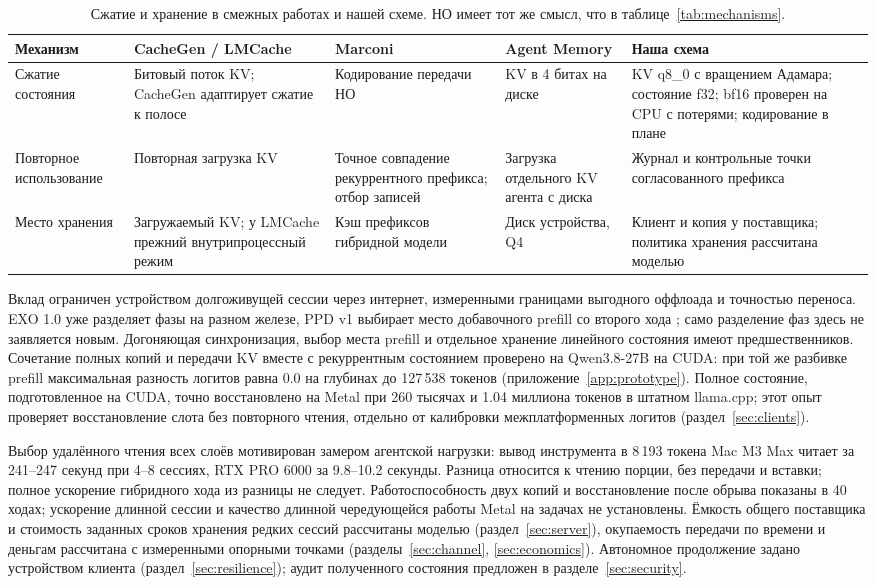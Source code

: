 \begin{table}[t]
\centering
\caption{Сжатие и хранение в смежных работах и нашей схеме. НО имеет тот же смысл, что в таблице~\ref{tab:mechanisms}.}
\label{tab:cache-mechanisms}
\scriptsize
\setlength{\tabcolsep}{1mm}
\begin{tabular}{L{26mm}L{34mm}L{31mm}L{31mm}L{34mm}}
\toprule
Механизм & CacheGen / LMCache \cite{liu2024cachegen,lmcacheCachegen} & Marconi \cite{pan2025marconi} & Agent Memory \cite{shkolnikov2026agentmemory} & Наша схема \\
\midrule
Сжатие состояния & Битовый поток KV; CacheGen адаптирует сжатие к полосе & Кодирование передачи НО & KV в 4 битах на диске & KV q8\_0 с вращением Адамара; состояние f32; bf16 проверен на CPU с потерями; кодирование в плане \\
Повторное использование & Повторная загрузка KV & Точное совпадение рекуррентного префикса; отбор записей & Загрузка отдельного KV агента с диска & Журнал и контрольные точки согласованного префикса \\
Место хранения & Загружаемый KV; у LMCache прежний внутрипроцессный режим & Кэш префиксов гибридной модели & Диск устройства, Q4 & Клиент и копия у поставщика; политика хранения рассчитана моделью \\
\bottomrule
\end{tabular}
\end{table}

Вклад ограничен устройством долгоживущей сессии через интернет, измеренными границами выгодного оффлоада
и точностью переноса. EXO 1.0 уже разделяет фазы на разном железе, PPD v1 выбирает место добавочного prefill
со второго хода \cite{exolabsSpark,li2026ppd}; само разделение фаз здесь не заявляется новым.
Догоняющая синхронизация, выбор места prefill и отдельное хранение линейного состояния имеют предшественников.
Сочетание полных копий и передачи KV вместе с рекуррентным состоянием проверено на Qwen3.8-27B на CUDA:
при той же разбивке prefill максимальная разность логитов равна 0.0 на глубинах до 127\,538 токенов
(приложение~\ref{app:prototype}). Полное состояние, подготовленное на CUDA, точно восстановлено на Metal
при 260 тысячах и 1.04 миллиона токенов в штатном llama.cpp; этот опыт проверяет восстановление слота без
повторного чтения, отдельно от калибровки межплатформенных логитов (раздел~\ref{sec:clients}).

Выбор удалённого чтения всех слоёв мотивирован замером агентской нагрузки: вывод инструмента в 8\,193 токена
Mac M3 Max читает за 241--247 секунд при 4--8 сессиях, RTX PRO 6000 за 9.8--10.2 секунды.
Разница относится к чтению порции, без передачи и вставки; полное ускорение гибридного хода из разницы не следует.
Работоспособность двух копий и восстановление после обрыва показаны в 40 ходах;
ускорение длинной сессии и качество длинной чередующейся работы Metal на задачах не установлены.
Ёмкость общего поставщика и стоимость заданных сроков хранения редких сессий рассчитаны моделью
(раздел~\ref{sec:server}), окупаемость передачи по времени и деньгам рассчитана с измеренными опорными точками
(разделы~\ref{sec:channel}, \ref{sec:economics}). Автономное продолжение задано устройством клиента
(раздел~\ref{sec:resilience}); аудит полученного состояния предложен в разделе~\ref{sec:security}.

